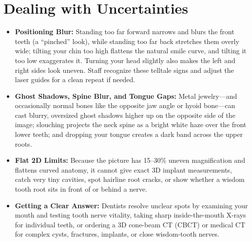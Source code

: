 \section{Dealing with Uncertainties}
\begin{itemize}
\item \textbf{Positioning Blur:} Standing too far forward narrows and blurs the front teeth (a ``pinched'' look), while standing too far back stretches them overly wide; tilting your chin too high flattens the natural smile curve, and tilting it too low exaggerates it. Turning your head slightly also makes the left and right sides look uneven. Staff recognize these telltale signs and adjust the laser guides for a clean repeat if needed.
\item \textbf{Ghost Shadows, Spine Blur, and Tongue Gaps:} Metal jewelry---and occasionally normal bones like the opposite jaw angle or hyoid bone---can cast blurry, oversized ghost shadows higher up on the opposite side of the image; slouching projects the neck spine as a bright white haze over the front lower teeth; and dropping your tongue creates a dark band across the upper roots.
\item \textbf{Flat 2D Limits:} Because the picture has 15--30\% uneven magnification and flattens curved anatomy, it cannot give exact 3D implant measurements, catch very tiny cavities, spot hairline root cracks, or show whether a wisdom tooth root sits in front of or behind a nerve.
\item \textbf{Getting a Clear Answer:} Dentists resolve unclear spots by examining your mouth and testing tooth nerve vitality, taking sharp inside-the-mouth X-rays for individual teeth, or ordering a 3D cone-beam CT (CBCT) or medical CT for complex cysts, fractures, implants, or close wisdom-tooth nerves.
\end{itemize}

